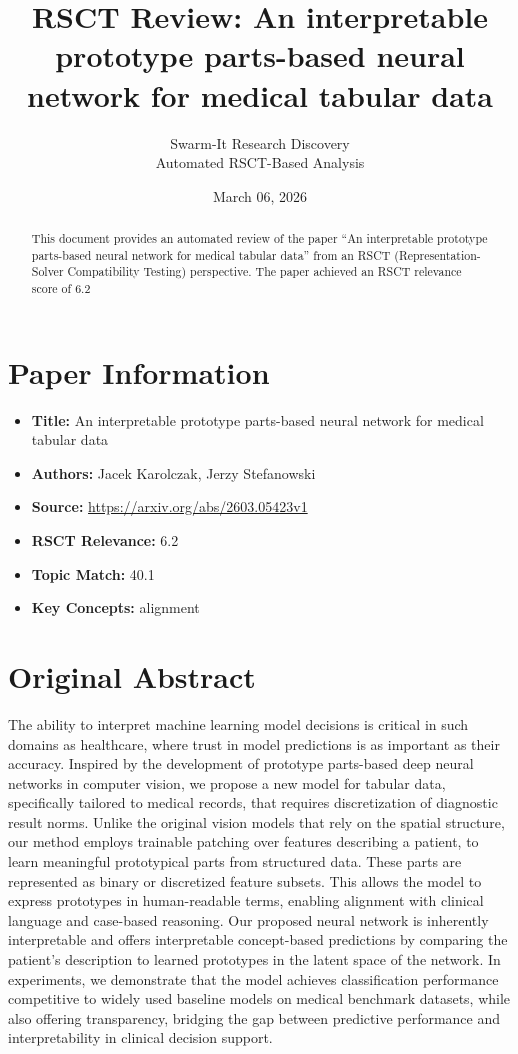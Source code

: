\documentclass[11pt,a4paper]{article}
\title{RSCT Review: An interpretable prototype parts-based neural network for medical tabular data}
\author{Swarm-It Research Discovery\\\small Automated RSCT-Based Analysis}
\date{March 06, 2026}
\begin{document}
\maketitle

\begin{abstract}
This document provides an automated review of the paper ``An interpretable prototype parts-based neural network for medical tabular data'' from an RSCT (Representation-Solver Compatibility Testing) perspective. The paper achieved an RSCT relevance score of 6.2%
\end{abstract}

\section{Paper Information}
\begin{itemize}
\item \textbf{Title:} An interpretable prototype parts-based neural network for medical tabular data
\item \textbf{Authors:} Jacek Karolczak, Jerzy Stefanowski
\item \textbf{Source:} \url{https://arxiv.org/abs/2603.05423v1}
\item \textbf{RSCT Relevance:} 6.2%
\item \textbf{Topic Match:} 40.1%
\item \textbf{Key Concepts:} alignment
\end{itemize}

\section{Original Abstract}
The ability to interpret machine learning model decisions is critical in such domains as healthcare, where trust in model predictions is as important as their accuracy. Inspired by the development of prototype parts-based deep neural networks in computer vision, we propose a new model for tabular data, specifically tailored to medical records, that requires discretization of diagnostic result norms. Unlike the original vision models that rely on the spatial structure, our method employs trainable patching over features describing a patient, to learn meaningful prototypical parts from structured data. These parts are represented as binary or discretized feature subsets. This allows the model to express prototypes in human-readable terms, enabling alignment with clinical language and case-based reasoning. Our proposed neural network is inherently interpretable and offers interpretable concept-based predictions by comparing the patient's description to learned prototypes in the latent space of the network. In experiments, we demonstrate that the model achieves classification performance competitive to widely used baseline models on medical benchmark datasets, while also offering transparency, bridging the gap between predictive performance and interpretability in clinical decision support.
\end{document}

